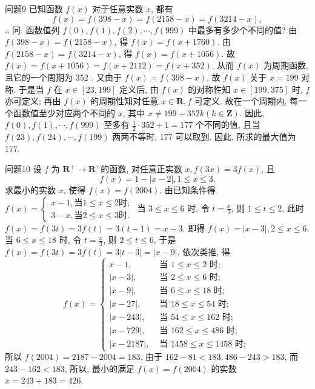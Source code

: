 问题9 已知函数 $f(x)$ 对于任意实数 $x$, 都有
$$
f(x)=f(398-x)=f(2158-x)=f(3214-x),
$$
$\therefore$ 问: 函数值列 $f(0), f(1), f(2), \cdots, f(999)$ 中最多有多少个不同的值?
由 $f(398-x)=f(2158-x)$, 得 $f(x)=f(x+1760)$. 由 $f(2158- x)=f(3214-x)$, 得 $f(x)=f(x+1056)$. 故 $f(x)=f(x+1056)= f(x+2112)=f(x+352)$. 从而 $f(x)$ 为周期函数, 且它的一个周期为 352 . 又由于 $f(x)=f(398-x)$, 故 $f(x)$ 关于 $x=199$ 对称.
于是当 $f$ 在 $x \in[23,199]$ 定义后, 由 $f(x)$ 的对称性知 $x \in[199,375]$ 时, $f$ 亦可定义; 再由 $f(x)$ 的周期性知对任意 $x \in \mathbf{R}, f$ 可定义.
故在一个周期内, 每一个函数值至少对应两个不同的 $x$, 其中 $x \neq 199+352 k(k \in \mathbf{Z})$. 因此, $f(0), f(1), \cdots, f(999)$ 至多有 $\frac{1}{2} \cdot 352+1=177$ 个不同的值, 且当 $f(23), f(24), \cdots, f(199)$ 两两不等时, 177 可以取到.
因此, 所求的最大值为 177. 



问题10 设 $f$ 为 $\mathbf{R}^{+} \rightarrow \mathbf{R}^{+}$的函数, 对任意正实数 $x, f(3 x)=3 f(x)$, 且
$$
f(x)=1-|x-2|, 1 \leqslant x \leqslant 3 .
$$
求最小的实数 $x$, 使得 $f(x)=f(2004)$.
由已知条件得 $f(x)=\left\{\begin{array}{l}x-1, 当1\leqslant x \leqslant 2时; \\ 3-x , 当2\leqslant x \leqslant 3时.
\end{array}\right.$ 
当 $3\leq x\leq6$ 时, 令 $t=\frac{x}{3}$, 则 $1 \leqslant t \leqslant 2$, 此时 $f(x)=f(3 t)=3 f(t)=3(t-1)=x-3$. 即得 $f(x)=|x-3|, 2 \leqslant x \leqslant 6$. 当 $6 \leqslant x \leqslant 18$ 时, 令 $t=\frac{x}{3}$, 则 $2 \leqslant t \leqslant 6$,
于是 $f(x)=f(3 t)=3 f(t)=3|t-3|=|x-9|$. 依次类推, 得
$$
f(x)= \begin{cases}x-1, & \text { 当 } 1 \leqslant x \leqslant 2 \text { 时; } \\ |x-3|, & \text { 当 } 2 \leqslant x \leqslant 6 \text { 时; } \\ |x-9|, & \text { 当 } 6 \leqslant x \leqslant 18 \text { 时; } \\ |x-27|, & \text { 当 } 18 \leqslant x \leqslant 54 \text { 时; } \\ |x-243|, & \text { 当 } 54 \leqslant x \leqslant 162 \text { 时; } \\ |x-729|, & \text { 当 } 162 \leqslant x \leqslant 486 \text { 时; } \\ |x-2187|, & \text { 当 } 1458 \leqslant x \leqslant 1458 \text { 时; }\end{cases}
$$
所以 $f(2004)=2187-2004=183$. 由于 $162-81<183,486-243>183$, 而 $243-162<183$, 所以, 最小的满足 $f(x)=f(2004)$ 的实数 $x=243+ 183=426$.


